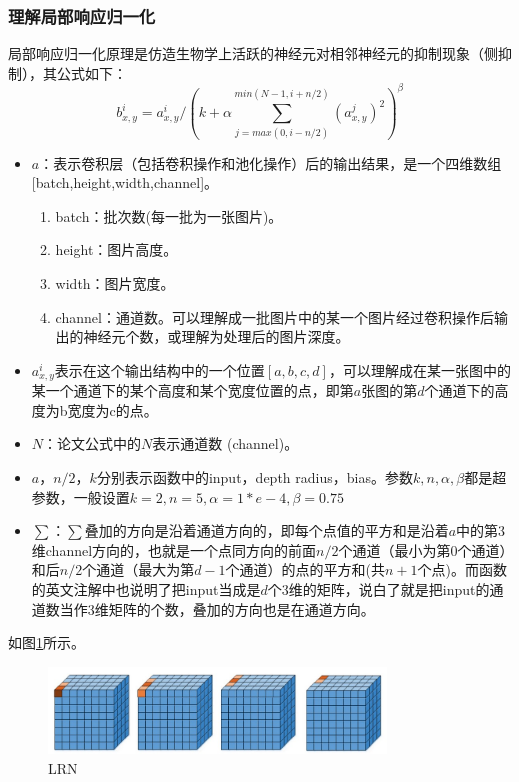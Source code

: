 \documentclass[UTF8]{ctexart}
\begin{document}
\subsubsection{理解局部响应归一化}
局部响应归一化原理是仿造生物学上活跃的神经元对相邻神经元的抑制现象（侧抑制），其公式如下：
$$b_{x,y}^i = a_{x,y}^i / (k + \alpha \sum_{j=max(0, i-n/2)}^{min(N-1, i+n/2)}(a_{x,y}^j)^2 )^\beta$$
\begin{itemize}
	\item $a$：表示卷积层（包括卷积操作和池化操作）后的输出结果，是一个四维数组[batch,height,width,channel]。 \begin{enumerate}
		\item batch：批次数(每一批为一张图片)。
		\item height：图片高度。
		\item width：图片宽度。
		\item channel：通道数。可以理解成一批图片中的某一个图片经过卷积操作后输出的神经元个数，或理解为处理后的图片深度。
	\end{enumerate}
	\item $ a_{x,y}^i $表示在这个输出结构中的一个位置$ [a,b,c,d] $，可以理解成在某一张图中的某一个通道下的某个高度和某个宽度位置的点，即第$ a $张图的第$ d $个通道下的高度为b宽度为c的点。
	\item $ N $：论文公式中的$ N $表示通道数 (channel)。
	\item $ a $，$ n/2 $，$ k $分别表示函数中的input，depth radius，bias。参数$ k, n, \alpha, \beta $都是超参数，一般设置$ k=2, n=5, \alpha=1*e-4, \beta=0.75 $
	\item $ \sum $：$ \sum $叠加的方向是沿着通道方向的，即每个点值的平方和是沿着$ a $中的第3维channel方向的，也就是一个点同方向的前面$ n/2 $个通道（最小为第$ 0 $个通道）和后$ n/2 $个通道（最大为第$ d-1 $个通道）的点的平方和(共$ n+1 $个点)。而函数的英文注解中也说明了把input当成是$ d $个3维的矩阵，说白了就是把input的通道数当作3维矩阵的个数，叠加的方向也是在通道方向。 
\end{itemize}
如图\ref{LRN1}所示。
\begin{figure}[htb]
	\centering
	\includegraphics[width=0.8\textwidth]{figures/LRN1.jpg}
	\caption{LRN}
	\label{LRN1}
\end{figure}
\end{document}
